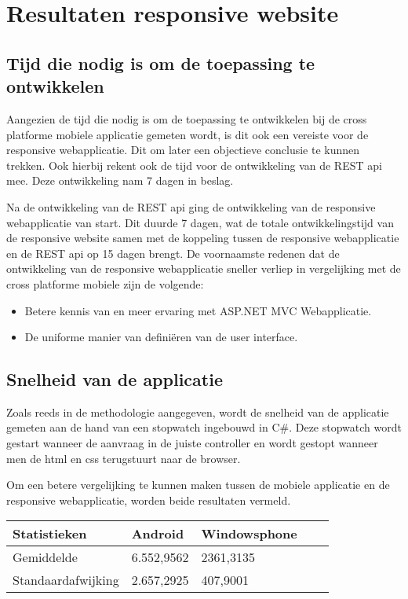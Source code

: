\chapter{Resultaten responsive website}
\label{ch:resultatenresponsivewebsite}
\section{Tijd die nodig is om de toepassing te ontwikkelen}
Aangezien de tijd die nodig is om de toepassing te ontwikkelen bij de cross platforme mobiele applicatie gemeten wordt,
is dit ook een vereiste voor de responsive webapplicatie. Dit om later een objectieve conclusie te kunnen trekken.
Ook hierbij rekent ook de tijd voor de ontwikkeling van de REST api mee. Deze ontwikkeling nam 7 dagen in beslag.

Na de ontwikkeling van de REST api ging de ontwikkeling van de responsive webapplicatie van start.
Dit duurde 7 dagen, wat de totale ontwikkelingstijd van de responsive website samen met de koppeling tussen de responsive webapplicatie
en de REST api op 15 dagen brengt. De voornaamste redenen dat de ontwikkeling van de responsive webapplicatie sneller verliep in vergelijking met de cross platforme mobiele zijn de volgende:
\begin{itemize}
  \item Betere kennis van en meer ervaring met ASP.NET MVC Webapplicatie.
  \item De uniforme manier van definiëren van de user interface.
\end{itemize}

\section{Snelheid van de applicatie}
Zoals reeds in de methodologie aangegeven, wordt de snelheid van de applicatie gemeten aan de hand van een stopwatch ingebouwd in C\#.
Deze stopwatch wordt gestart wanneer de aanvraag in de juiste controller en wordt gestopt wanneer men de html en css terugstuurt naar de browser.

Om een betere vergelijking te kunnen maken tussen de mobiele applicatie en de responsive webapplicatie, worden beide resultaten vermeld.

\begin{center}
\begin{tabular}{| l | l | l | | l | l }
  \hline
  Statistieken & Android & Windowsphone \\ \hline
  Gemiddelde & 6.552,9562 & 2361,3135 \\ \hline
  Standaardafwijking & 2.657,2925 & 407,9001 \\
  \hline
\end{tabular}
\end{center}

